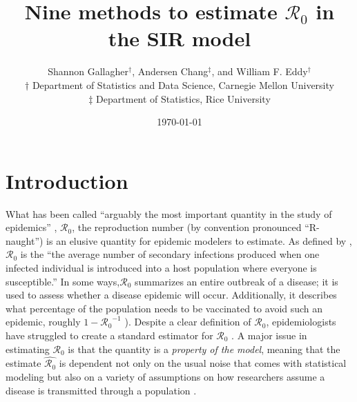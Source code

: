 \documentclass[12pt]{article}
\newcommand{\Wxxsir}{Nine } %
\newcommand{\rr}{\ensuremath{\mathcal{R}_0}}
\begin{document}




\title{\Wxxsir methods to estimate $\rr$ in the SIR model}
\author{ Shannon Gallagher$^{\dag}$, Andersen Chang$^{\ddag}$, and William F. Eddy$^{\dag}$ \\$\dag$ Department of Statistics and Data Science, Carnegie Mellon University\\ $\ddag$ Department of Statistics, Rice University}
\date{\today}
\maketitle



\section{Introduction}\label{sec:intro}
What has been called ``arguably the most important quantity in the study of epidemics'' \citep{Heesterbeek2002},  $\mathcal{R}_0$, the reproduction number (by convention pronounced ``R-naught'') is an elusive quantity for epidemic modelers to estimate.  As defined by \citet{anderson1992}, $\rr$ is the ``the average number of secondary infections produced when one infected individual is introduced into a host population where everyone is susceptible.''  In some ways,$\rr$ summarizes an entire outbreak of a disease; it  is used to assess whether a disease epidemic will occur.  Additionally, it describes what percentage of the population needs to be vaccinated to avoid such an epidemic, roughly $1-\rr^{-1}$ \citep{anderson1992}).  Despite a clear definition of $\rr$, epidemiologists have struggled to create a standard  estimator for $\rr$  \citep{hethcote2000}.  A major issue in estimating $\rr$ is that the quantity is a \textit{property of the model}, meaning that the estimate $\hat{\rr}$ is dependent not only on the usual noise that comes with statistical modeling but also on a variety of assumptions on how researchers assume a disease is transmitted through a population \citep{diekmann2009}.
\end{document}
